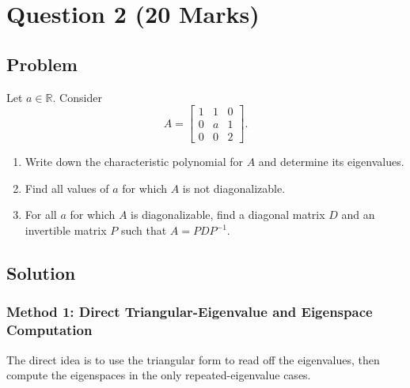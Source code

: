 \documentclass[12pt]{article}
\newcommand{\R}{\mathbb{R}}
\begin{document}
\newpage
\section{Question 2 \hfill (20 Marks)}

\subsection{Problem}
Let $a\in\R$. Consider
\[
A=\begin{bmatrix}
1&1&0\\
0&a&1\\
0&0&2
\end{bmatrix}.
\]
\begin{enumerate}[label=(\alph*)]
  \item Write down the characteristic polynomial for $A$ and determine its eigenvalues.
  \item Find all values of $a$ for which $A$ is not diagonalizable.
  \item For all $a$ for which $A$ is diagonalizable, find a diagonal matrix $D$ and an invertible matrix $P$ such that $A=PDP^{-1}$.
\end{enumerate}

\bigskip
\subsection{Solution}

\subsubsection{Method 1: Direct Triangular-Eigenvalue and Eigenspace Computation}
The direct idea is to use the triangular form to read off the eigenvalues, then compute the eigenspaces in the only repeated-eigenvalue cases.
\end{document}
